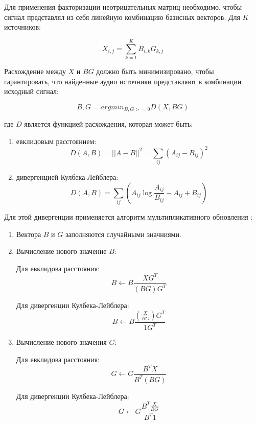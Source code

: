 Для применения факторизации неотрицательных матриц необходимо, чтобы сигнал представлял из себя линейную комбинацию базисных векторов. Для $K$ источников:

\begin{equation}
X_{i,j} = \sum_{k=1}^{K} B_{i,k} G_{k, j}
\end{equation}

Расхождение между $X$ и $BG$ должно быть минимизировано, чтобы гарантировать, что найденные аудио источники представляют в комбинации исходный сигнал:

\begin{equation}
{B, G} = argmin_{B, G >= 0} D (X, BG)
\end{equation}

где $D$ является функцией расхождения, которая может быть:

\begin{enumerate}
	\item евклидовым расстоянием:
	\begin{equation}
	D (A, B) = ||A-B||^2 = \sum_{ij}(A_{ij} - B_{ij})^2
	\end{equation}
	\item дивергенцией Кулбека-Лейблера:
	\begin{equation}
		D (A, B) = \sum_{ij} (A_{ij} \log\frac{A_{ij}}{B_{ij}} - A_{ij} + B_{ij})
	\end{equation}
\end{enumerate}

Для этой дивергенции применяется алгоритм мультипликативного обновления \cite{DLee}:

\begin{enumerate}
	\item Вектора $B$ и $G$ заполняются случайными значниями.
	\item Вычисление нового значение $B$: 
	
	Для евклидова расстояния:
	\begin{equation}
	B \leftarrow B \frac{XG^T}{(BG)G^T}
	\end{equation}
	
	Для дивергенции Кулбека-Лейблера:
	\begin{equation}
	B \leftarrow B \frac{ (\frac{X}{BG}) G^T}{1G^T}
	\end{equation}
	\item Вычисление нового значения $G$:
	
	Для евклидова расстояния:
	\begin{equation}
	G \leftarrow G \frac{B^T X}{B^T (BG)}
	\end{equation}
	
	Для дивергенции Кулбека-Лейблера:
	\begin{equation}
	G \leftarrow G \frac{B^T \frac{X}{BG}}{B^T1}
	\end{equation}
\end{enumerate}

